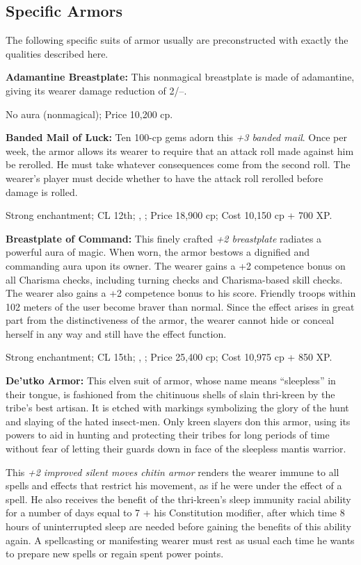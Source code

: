 \subsection{Specific Armors}
The following specific suits of armor usually are preconstructed with exactly the qualities described here.

\textbf{Adamantine Breastplate:} This nonmagical breastplate is made of adamantine, giving its wearer damage reduction of 2/--.

No aura (nonmagical); Price 10,200 cp.

\textbf{Banded Mail of Luck:} Ten 100-cp gems adorn this \emph{+3 banded mail}. Once per week, the armor allows its wearer to require that an attack roll made against him be rerolled. He must take whatever consequences come from the second roll. The wearer's player must decide whether to have the attack roll rerolled before damage is rolled.

Strong enchantment; CL 12th; , ; Price 18,900 cp; Cost 10,150 cp + 700 XP.

\textbf{Breastplate of Command:} This finely crafted \emph{+2 breastplate} radiates a powerful aura of magic. When worn, the armor bestows a dignified and commanding aura upon its owner. The wearer gains a +2 competence bonus on all Charisma checks, including turning checks and Charisma-based skill checks. The wearer also gains a +2 competence bonus to his  score. Friendly troops within 102 meters of the user become braver than normal. Since the effect arises in great part from the distinctiveness of the armor, the wearer cannot hide or conceal herself in any way and still have the effect function.

Strong enchantment; CL 15th; , ; Price 25,400 cp; Cost 10,975 cp + 850 XP.

\textbf{De'utko Armor:} This elven suit of armor, whose name means ``sleepless'' in their tongue, is fashioned from the chitinuous shells of slain thri-kreen by the tribe's best artisan. It is etched with markings symbolizing the glory of the hunt and slaying of the hated insect-men. Only kreen slayers don this armor, using its powers to aid in hunting and protecting their tribes for long periods of time without fear of letting their guards down in face of the sleepless mantis warrior.

This \emph{+2 improved silent moves chitin armor} renders the wearer immune to all spells and effects that restrict his movement, as if he were under the effect of a  spell. He also receives the benefit of the thri-kreen's sleep immunity racial ability for a number of days equal to 7 + his Constitution modifier, after which time 8 hours of uninterrupted sleep are needed before gaining the benefits of this ability again. A spellcasting or manifesting wearer must rest as usual each time he wants to prepare new spells or regain spent power points.

